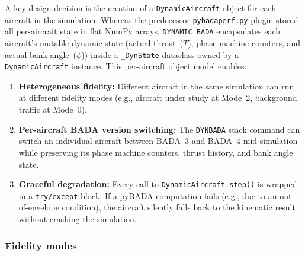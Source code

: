 A key design decision is the creation of a \texttt{DynamicAircraft} object for each aircraft in the simulation.  Whereas the predecessor \texttt{pybadaperf.py} plugin stored all per-aircraft state in flat NumPy arrays, \texttt{DYNAMIC\_BADA} encapsulates each aircraft's mutable dynamic state (actual thrust~($T$), phase machine counters, and actual bank angle~($\phi$)) inside a \texttt{\_DynState} dataclass owned by a \texttt{DynamicAircraft} instance.  This per-aircraft object model enables:
\begin{enumerate}
    \item \textbf{Heterogeneous fidelity:} Different aircraft in the same simulation can run at different fidelity modes (e.g., aircraft under study at Mode~2, background traffic at Mode~0).
    \item \textbf{Per-aircraft BADA version switching:} The \texttt{DYNBADA} stack command can switch an individual aircraft between BADA~3 and BADA~4 mid-simulation while preserving its phase machine counters, thrust history, and bank angle state.
    \item \textbf{Graceful degradation:} Every call to \texttt{DynamicAircraft.step()} is wrapped in a \texttt{try/except} block.  If a pyBADA computation fails (e.g., due to an out-of-envelope condition), the aircraft silently falls back to the kinematic result without crashing the simulation.
\end{enumerate}

\subsubsection{Fidelity modes}
\label{sec:fidelity_modes}

